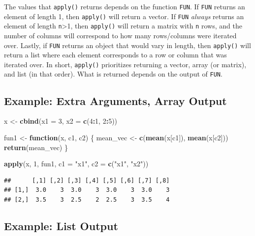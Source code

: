 \documentclass[
]{book}
\newenvironment{Shaded}{\begin{snugshade}}{\end{snugshade}}
\newcommand{\ControlFlowTok}[1]{\textcolor[rgb]{0.13,0.29,0.53}{\textbf{#1}}}
\newcommand{\DataTypeTok}[1]{\textcolor[rgb]{0.13,0.29,0.53}{#1}}
\newcommand{\DecValTok}[1]{\textcolor[rgb]{0.00,0.00,0.81}{#1}}
\newcommand{\KeywordTok}[1]{\textcolor[rgb]{0.13,0.29,0.53}{\textbf{#1}}}
\newcommand{\NormalTok}[1]{#1}
\newcommand{\OperatorTok}[1]{\textcolor[rgb]{0.81,0.36,0.00}{\textbf{#1}}}
\newcommand{\StringTok}[1]{\textcolor[rgb]{0.31,0.60,0.02}{#1}}
\begin{document}
The values that \texttt{apply()} returns depends on the function \texttt{FUN}. If \texttt{FUN} returns an element of length 1, then \texttt{apply()} will return a vector. If \texttt{FUN} \emph{always} returns an element of length \texttt{n}\textgreater1, then \texttt{apply()} will return a matrix with \texttt{n} rows, and the number of columns will correspond to how many rows/columns were iterated over. Lastly, if \texttt{FUN} returns an object that would vary in length, then \texttt{apply()} will return a list where each element corresponds to a row or column that was iterated over. In short, \texttt{apply()} prioritizes returning a vector, array (or matrix), and list (in that order). What is returned depends on the output of \texttt{FUN}.

\hypertarget{example-extra-arguments-array-output}{%
\subsection{Example: Extra Arguments, Array Output}\label{example-extra-arguments-array-output}}

\begin{Shaded}
\begin{Highlighting}[]
\NormalTok{x <-}\StringTok{ }\KeywordTok{cbind}\NormalTok{(}\DataTypeTok{x1 =} \DecValTok{3}\NormalTok{, }\DataTypeTok{x2 =} \KeywordTok{c}\NormalTok{(}\DecValTok{4}\OperatorTok{:}\DecValTok{1}\NormalTok{,}
    \DecValTok{2}\OperatorTok{:}\DecValTok{5}\NormalTok{))}

\NormalTok{fun1 <-}\StringTok{ }\ControlFlowTok{function}\NormalTok{(x, c1,}
\NormalTok{    c2) \{}
\NormalTok{    mean_vec <-}\StringTok{ }\KeywordTok{c}\NormalTok{(}\KeywordTok{mean}\NormalTok{(x[c1]),}
        \KeywordTok{mean}\NormalTok{(x[c2]))}
    \KeywordTok{return}\NormalTok{(mean_vec)}
\NormalTok{\}}

\KeywordTok{apply}\NormalTok{(x, }\DecValTok{1}\NormalTok{, fun1, }\DataTypeTok{c1 =} \StringTok{"x1"}\NormalTok{,}
    \DataTypeTok{c2 =} \KeywordTok{c}\NormalTok{(}\StringTok{"x1"}\NormalTok{, }\StringTok{"x2"}\NormalTok{))}
\end{Highlighting}
\end{Shaded}

\begin{verbatim}
##      [,1] [,2] [,3] [,4] [,5] [,6] [,7] [,8]
## [1,]  3.0    3  3.0    3  3.0    3  3.0    3
## [2,]  3.5    3  2.5    2  2.5    3  3.5    4
\end{verbatim}

\hypertarget{example-list-output}{%
\subsection{Example: List Output}\label{example-list-output}}
\end{document}
